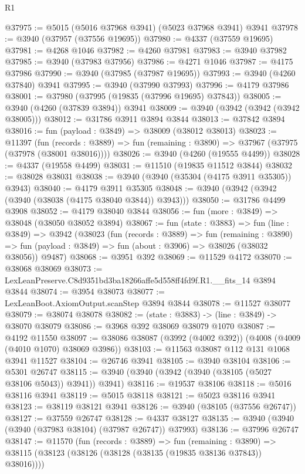 \begin{lexlean}{R1}
\begin{coremodule}
@37975 := @5015 (@5016 @37968 @3941) (@5023 @37968 @3941) @3941
@37978 := @3940 (@37957 (@37556 @19695))
@37980 := @4337 (@37559 @19695)
@37981 := @4268 @1046
@37982 := @4260 @37981
@37983 := @3940 @37982
@37985 := @3940 (@37983 @37956)
@37986 := @4271 @1046
@37987 := @4175 @37986
@37990 := @3940 (@37985 (@37987 @19695))
@37993 := @3940 (@4260 @37840) @3941
@37995 := @3940 (@37990 @37993)
@37996 := @4179 @37986
@38001 := @37980 (@37995 (@19835 (@37996 @19695) @37843))
@38005 := @3940 (@4260 (@37839 @3894)) @3941
@38009 := @3940 (@3942 (@3942 (@3942 @38005)))
@38012 := @31786 @3911 @3894 @3844
@38013 := @37842 @3894
@38016 := fun (payload : @3849) => @38009 (@38012 @38013)
@38023 := @11397
    (fun (records : @3889) => fun (remaining : @3890) => @37967 (@37975 (@37978 (@38001 @38016))))
@38026 := @3940 (@4260 (@19555 @4499))
@38028 := @4337 (@19558 @4499)
@38031 := @11510 (@19835 @11512 @3844)
@38032 := @38028 @38031
@38038 := @3940 (@3940 (@35304 (@4175 @3911 @35305)) @3943)
@38040 := @4179 @3911 @35305
@38048 := @3940 (@3942 (@3942 (@3940 (@38038 (@4175 @38040 @3844)) @3943)))
@38050 := @31786 @4499 @3908
@38052 := @4179 @38040 @3844
@38056 := fun (more : @3849) => @38048 (@38050 @38052 @3894)
@38067 := fun (state : @3883) =>
  fun (line : @3849) =>
  @3942
    (@38023
      (fun (records : @3889) =>
      fun (remaining : @3890) =>
      fun (payload : @3849) => fun (about : @3906) => @38026 (@38032 @38056))
      @9487)
@38068 := @3951 @392
@38069 := @11529 @4172
@38070 := @38068 @38069
@38073 := LexLeanPreserve.C8d9351bd3ba18266affe5d558ff4fd9f.R1.__fits_14 @3894 @3844
@38074 := @3954 @38073
@38077 := LexLeanBoot.AxiomOutput.scanStep @3894 @3844
@38078 := @11527 @38077
@38079 := @38074 @38078
@38082 := (state : @3883) -> (line : @3849) -> @38070 @38079
@38086 := @3968 @392 @38069 @38079 @1070
@38087 := @4192 @11550
@38097 := @38086 @38087 (@3992 (@4002 @392)) (@4008 (@4009 (@4010 @1070) @38069 @3986))
@38103 := @11563 @38087 @112 @131 @1068 @3941 @11527
@38104 := @26746 @3941
@38105 := @3940 @38104
@38106 := @5301 @26747
@38115 := @3940 (@3940 (@3942 (@3940 (@38105 (@5027 @38106 @5043)) @3941)) @3941)
@38116 := @19537 @38106
@38118 := @5016 @38116 @3941
@38119 := @5015 @38118
@38121 := @5023 @38116 @3941
@38123 := @38119 @38121 @3941
@38126 := @3940 (@38105 (@37556 @26747))
@38127 := @37559 @26747
@38128 := @4337 @38127
@38135 := @3940 (@3940 (@3940 (@37983 @38104) (@37987 @26747)) @37993)
@38136 := @37996 @26747
@38147 := @11570
    (fun (records : @3889) =>
    fun (remaining : @3890) =>
    @38115 (@38123 (@38126 (@38128 (@38135 (@19835 @38136 @37843)) @38016))))

\end{coremodule}
\end{lexlean}
